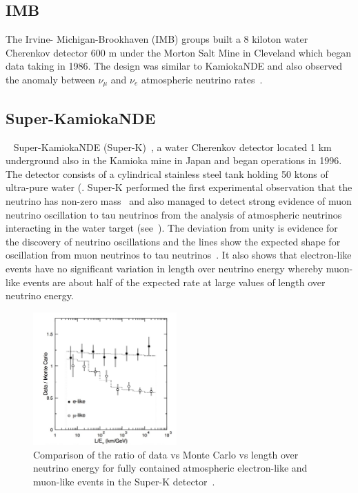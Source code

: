 \subsection{IMB}
The Irvine- Michigan-Brookhaven (IMB) groups built a 8 kiloton water Cherenkov detector 600 m under the Morton Salt Mine in Cleveland which began data taking in 1986. The design was similar to KamiokaNDE and also observed the anomaly between $\nu_\mu$ and $\nu_e$ atmospheric neutrino rates~\cite{60IMB}.


\subsection{Super-KamiokaNDE}~\label{subsection:Super-K}
Super-KamiokaNDE (Super-K)~\cite{20SUPERK}, a water Cherenkov detector located 1 km underground also in the Kamioka mine in Japan and began operations in 1996. The detector consists of a cylindrical stainless steel tank holding 50 ktons of ultra-pure water (. Super-K performed the first experimental observation that the neutrino has non-zero mass~\cite{10Fukuda} and also managed to detect strong evidence of muon neutrino oscillation to tau neutrinos from the analysis of atmospheric neutrinos interacting in the water target (see~). The deviation from unity is evidence for the discovery of neutrino oscillations and the lines show the expected shape for oscillation from muon neutrinos to tau neutrinos~\cite{10Fukuda}. It also shows that electron-like events have no significant variation in length over neutrino energy whereby muon-like events are about half of the expected rate at large values of length over neutrino energy.

\begin{figure}[h!]
\centering
  \centering
\includegraphics[width=0.49\textwidth]{figures/simuSK2.jpeg}
\vspace{2mm}
\caption{Comparison of the ratio of data vs Monte Carlo vs length over neutrino energy for fully contained atmospheric electron-like and muon-like events in the Super-K detector~\cite{10Fukuda}.}
\label{fig:SK2}
\end{figure}

